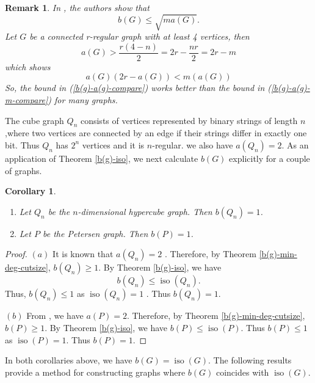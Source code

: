 \documentclass[12pt]{article}
\newtheorem{cor}{Corollary}[section]
\newtheorem{remark}{Remark}[section]
\DeclareMathOperator{\iso}{iso}
\begin{document}
\begin{remark}
In \cite{enide-geir-2024}, the authors show that \begin{equation}\label{b(g)-a(g)-m-compare}
    b(G) \leq \sqrt{ma(G)}.
    \end{equation}
    Let $G$ be a connected r-regular graph with at least 4 vertices, then 
    $$
a(G)>\frac{r(4-n)}{2}=2r-\frac{nr}{2}=2r-m
    $$
    which shows 
    $$
a(G)(2r-a(G)) < m(a(G))
    $$
    So, the bound in (\ref{b(g)-a(g)-compare}) works better than the bound in (\ref{b(g)-a(g)-m-compare}) for many graphs.
\end{remark}
 The cube graph $Q_n$ consists of vertices represented by binary strings of length $n$,where two vertices are connected by an edge if their strings differ in exactly one bit. Thus $Q_n$ has $2^n$ vertices and it is  $n$-regular. we also have $a(Q_n)=2$\cite{alg-con}. 
As an application of Theorem \ref{b(g)-iso}, we next calculate $b(G)$ explicitly for a couple of graphs. 
\begin{cor}
\begin{enumerate}
    \item[(a)]     Let $Q_n$ be the $n$-dimensional hypercube graph. Then $b(Q_n)=1$.
\item[(b)]    Let $P$ be the Petersen graph. Then $b(P)=1$.

\end{enumerate}
\end{cor}
\begin{proof}
   \textbf{$(a)$} It is known that  $a(Q_n)=2$  \cite{alg-con}. Therefore, by Theorem \ref{b(g)-min-deg-cutsize}, $b(Q_n) \geq 1$. By Theorem \ref{b(g)-iso}, we have $$b(Q_n) \leq \iso (Q_n).$$ Thus, $b(Q_n) \leq 1$ as $\iso(Q_n)=1$ \cite[Example $2.9$]{nica-book-2018}. Thus $b(Q_n)=1$.

   \textbf{$(b)$}   From \cite{old-new-a(G)}, we have $a(P)=2$. Therefore, by Theorem \ref{b(g)-min-deg-cutsize}, $b(P) \geq 1$. By Theorem \ref{b(g)-iso}, we have $b(P) \leq \iso(P)$. Thus $b(P) \leq 1$ as $\iso(P)=1$\cite{nica-book-2018}. Thus $b(P)=1$.
\end{proof}


In both corollaries above, we have $b(G)=\iso(G)$. The following results provide a method for constructing graphs where $b(G)$ coincides with $\iso(G)$.
\end{document}
